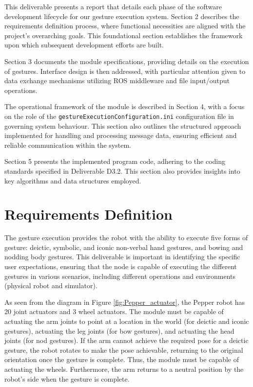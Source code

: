 \documentclass{CSSRforAfrica}
\begin{document}
This deliverable presents a report that details each phase of the software development lifecycle for our gesture execution system. Section 2 describes the requirements definition process, where functional necessities are aligned with the project's overarching goals. This foundational section establishes the framework upon which subsequent development efforts are built.

Section 3 documents the module specifications, providing details on the execution of gestures. Interface design is then addressed, with particular attention given to data exchange mechanisms utilizing ROS middleware and file input/output operations.

The operational framework of the module is described in Section 4, with a focus on the role of the \texttt{gestureExecutionConfiguration.ini} configuration file in governing system behaviour. This section also outlines the structured approach implemented for handling and processing message data, ensuring efficient and reliable communication within the system. 

Section 5 presents the implemented program code, adhering to the coding standards specified in Deliverable D3.2. This section also provides insights into key algorithms and data structures employed. 

\newpage

 

\section{Requirements Definition}
The gesture execution provides the robot with the ability to execute five forms of gesture: deictic, symbolic, and iconic non-verbal hand gestures, and bowing and nodding body gestures. This deliverable is important in identifying the specific user expectations, 
ensuring that the node is capable of executing the different gestures in various scenarios, including different
operations and environments (physical robot and simulator). 


As seen from the diagram in Figure \ref{fig:Pepper_actuator}, the Pepper robot has 20 joint actuators and 3 wheel actuators.
The module must be capable of actuating the arm joints to point at a location in the world (for deictic and iconic gestures), actuating the leg joints (for bow gestures), and actuating the head joints (for nod gestures).  If the arm cannot achieve the required pose for a deictic gesture, the robot rotates to make the pose achievable, returning to the original orientation once the gesture is complete. Thus, the module must be capable of actuating the wheels. Furthermore, the arm returns to a neutral position by the robot’s side when the gesture is complete. 
\end{document}

